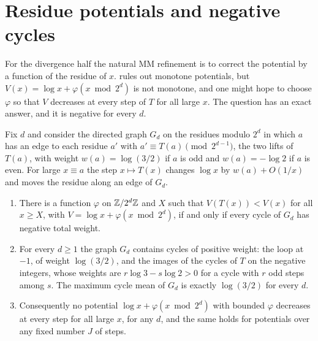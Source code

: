 \section{Residue potentials and negative cycles}\label{sec:ch5c:residue}

For the divergence half the natural MM refinement is to correct the potential
by a function of the residue of $x$.  rules out monotone
potentials, but $V(x)=\log x+\varphi(x\bmod2^d)$ is not monotone, and one might
hope to choose $\varphi$ so that $V$ decreases at every step of $T$ for all
large $x$. The question has an exact answer, and it is negative for every $d$.

Fix $d$ and consider the directed graph $G_d$ on the residues modulo $2^d$ in
which $a$ has an edge to each residue $a'$ with $a'\equiv T(a)\pmod{2^{d-1}}$,
the two lifts of $T(a)$, with weight $w(a)=\log(3/2)$ if $a$ is odd and
$w(a)=-\log2$ if $a$ is even. For large $x\equiv a$ the step $x\mapsto T(x)$
changes $\log x$ by $w(a)+O(1/x)$ and moves the residue along an edge of $G_d$.

\begin{theorem}\label{thm:ch5c:residue}
\leavevmode
\begin{enumerate}[label=(\roman*),leftmargin=2em]
\item There is a function $\varphi$ on $\mathbb{Z}/2^d\mathbb{Z}$ and $X$ such that
  $V(T(x))<V(x)$ for all $x\ge X$, with $V=\log x+\varphi(x\bmod2^d)$, if and
  only if every cycle of $G_d$ has negative total weight.
\item For every $d\ge1$ the graph $G_d$ contains cycles of positive weight: the
  loop at $-1$, of weight $\log(3/2)$, and the images of the cycles of $T$ on
  the negative integers, whose weights are $r\log3-s\log2>0$ for a cycle with
  $r$ odd steps among $s$. The maximum cycle mean of $G_d$ is exactly
  $\log(3/2)$ for every $d$.
\item Consequently no potential $\log x+\varphi(x\bmod2^d)$ with bounded
  $\varphi$ decreases at every step for all large $x$, for any $d$, and the
  same holds for potentials over any fixed number $J$ of steps.
\end{enumerate}
\end{theorem}

